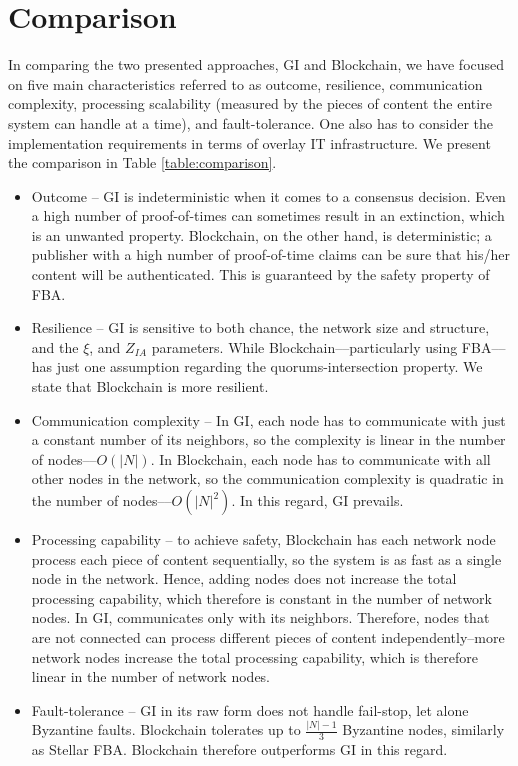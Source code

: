 \chapter{Comparison}
\label{comparison}
In comparing the two presented approaches, GI and Blockchain, we have focused on five main characteristics referred to as outcome, resilience, communication complexity, processing scalability (measured by the pieces of content the entire system can handle at a time), and fault-tolerance. One also has to consider the implementation requirements in terms of overlay IT infrastructure. We present the comparison in Table \ref{table:comparison}.
\begin{itemize}

    \item Outcome -- GI is indeterministic when it comes to a consensus decision. Even a high number of proof-of-times can sometimes result in an extinction, which is an unwanted property. Blockchain, on the other hand, is deterministic; a publisher with a high number of proof-of-time claims can be sure that his/her content will be authenticated. This is guaranteed by the safety property of FBA.
    
    \item Resilience -- GI is sensitive to both chance, the network size and structure, and the $\xi$, and $Z_{IA}$ parameters. While Blockchain––particularly using FBA––has just one assumption regarding the quorums-intersection property. We state that Blockchain is more resilient.
    
    \item Communication complexity -- In GI, each node has to communicate with just a constant number of its neighbors, so the complexity is linear in the number of nodes––$O(|N|)$. In Blockchain, each node has to communicate with all other nodes in the network, so the communication complexity is quadratic in the number of nodes––$O(|N|^2)$. In this regard, GI prevails.
    
    \item Processing capability -- to achieve safety, Blockchain has each network node process each piece of content sequentially, so the system is as fast as a single node in the network. Hence, adding nodes does not increase the total processing capability, which therefore is constant in the number of network nodes. In GI, communicates only with its neighbors. Therefore, nodes that are not connected can process different pieces of content independently--more network nodes increase the total processing capability, which is therefore linear in the number of network nodes.
    
    \item Fault-tolerance -- GI in its raw form does not handle fail-stop, let alone Byzantine faults. Blockchain tolerates up to $\frac{|N|-1}{3}$ Byzantine nodes, similarly as Stellar FBA. Blockchain therefore outperforms GI in this regard.
    
\end{itemize}

